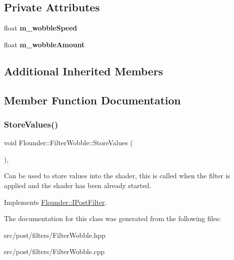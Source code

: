 \subsection*{Private Attributes}
\begin{DoxyCompactItemize}
\item 
\mbox{\label{class_flounder_1_1_filter_wobble_a98f2667acb9c7be07791d86c69261638}} 
float {\bfseries m\+\_\+wobble\+Speed}
\item 
\mbox{\label{class_flounder_1_1_filter_wobble_a2952d2210cfb0a0c43ff25fdb0de672b}} 
float {\bfseries m\+\_\+wobble\+Amount}
\end{DoxyCompactItemize}
\subsection*{Additional Inherited Members}


\subsection{Member Function Documentation}
\mbox{\label{class_flounder_1_1_filter_wobble_a678972a9832e8c750b7bd09979f342fa}} 
\subsubsection{\texorpdfstring{Store\+Values()}{StoreValues()}}
{\footnotesize\ttfamily void Flounder\+::\+Filter\+Wobble\+::\+Store\+Values (\begin{DoxyParamCaption}{ }\end{DoxyParamCaption})\hspace{0.3cm}{\ttfamily [override]}, {\ttfamily [virtual]}}



Can be used to store values into the shader, this is called when the filter is applied and the shader has been already started. 



Implements \hyperlink{class_flounder_1_1_i_post_filter_a20420ec0a9bac67437740552bea9ab74}{Flounder\+::\+I\+Post\+Filter}.



The documentation for this class was generated from the following files\+:\begin{DoxyCompactItemize}
\item 
src/post/filters/Filter\+Wobble.\+hpp\item 
src/post/filters/Filter\+Wobble.\+cpp\end{DoxyCompactItemize}
